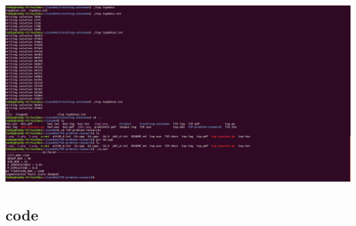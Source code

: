 \documentclass[a4paper,man,natbib]{apa6}
\begin{document}
\includegraphics[width=1\linewidth]{5}
\subsection{code}
\end{document}
